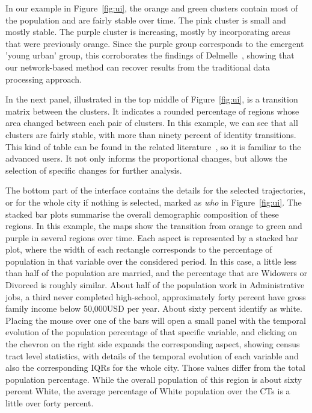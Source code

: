 In our example in Figure~\ref{fig:ui}, the orange and green clusters contain
most of the population and are fairly stable over time. The pink cluster is
small and mostly stable. The purple cluster is increasing, mostly by
incorporating areas that were previously orange. Since the purple group
corresponds to the emergent 'young urban' group, this corroborates the findings
of Delmelle~\citep{Delmelle2016,Delmelle2017}, showing that our network-based
method can recover results from the traditional data processing approach.

In the next panel, illustrated in the top middle of Figure~\ref{fig:ui}, is a
transition matrix between the clusters. It indicates a rounded percentage of
regions whose area changed between each pair of clusters. In this example, we
can see that all clusters are fairly stable, with more than ninety percent of
identity transitions. This kind of table can be found in the related
literature~\citep{Delmelle2016}, so it is familiar to the advanced users. It not
only informs the proportional changes, but allows the selection of specific
changes for further analysis.


The bottom part of the interface contains the details for the selected
trajectories, or for the whole city if nothing is selected, marked as \emph{who}
in Figure~\ref{fig:ui}. The stacked bar plots summarise the overall demographic
composition of these regions. In this example, the maps show the transition from
orange to green and purple in several regions over time. Each aspect is
represented by a stacked bar plot, where the width of each rectangle corresponds
to the percentage of population in that variable over the considered period. In
this case, a little less than half of the population are married, and the
percentage that are Widowers or Divorced is roughly similar. About half of the
population work in Administrative jobs, a third never completed high-school,
approximately forty percent have gross family income below 50,000USD per year.
About sixty percent identify as white. Placing the mouse over one of the bars
will open a small panel with the temporal evolution of the population percentage
of that specific variable, and clicking on the chevron on the right side expands
the corresponding aspect, showing census tract level statistics, with details of
the temporal evolution of each variable and also the corresponding IQRs for the
whole city. Those values differ from the total population percentage. While the
overall population of this region is about sixty percent White, the average
percentage of White population over the CTs is a little over forty percent.

